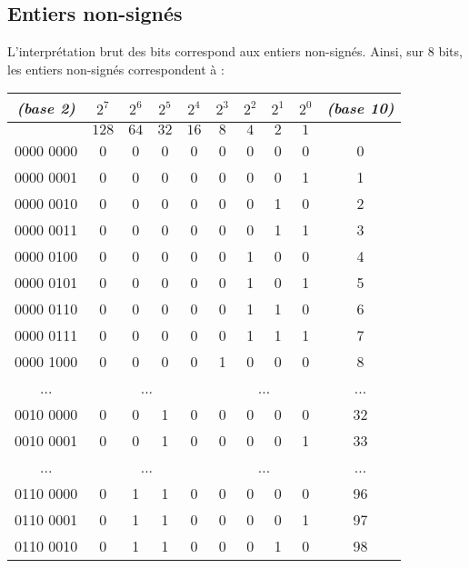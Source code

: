 \documentclass[11pt,a4paper]{article}
\begin{document}
\bigskip


\subsection{Entiers non-signés}

\medskip

L'interprétation brut des bits correspond aux entiers non-signés.
Ainsi, sur 8 bits, les entiers non-signés correspondent à :

\bigskip

\begin{center}
\begin{tabular}{ | c | c c c c | c c c c | c |}
\hline
\textit{(base 2)} & $ 2^7 $ & $ 2^6 $ & $ 2^5 $ & $ 2^4 $   &   $ 2^3 $ & $ 2^2 $ & $ 2^1 $ & $ 2^0 $ & \textit{(base 10)} \\
\hline
         & $ 128 $ & $  64 $ & $  32 $ & $  16 $   &   $   8 $ & $   4 $ & $   2 $ & $   1 $ & \\
\hline
0000 0000  &  0 & 0 & 0 & 0  &  0 & 0 & 0 & 0   & 0 \\
0000 0001  &  0 & 0 & 0 & 0  &  0 & 0 & 0 & 1   & 1 \\
0000 0010  &  0 & 0 & 0 & 0  &  0 & 0 & 1 & 0   & 2 \\
0000 0011  &  0 & 0 & 0 & 0  &  0 & 0 & 1 & 1   & 3 \\
0000 0100  &  0 & 0 & 0 & 0  &  0 & 1 & 0 & 0   & 4 \\
0000 0101  &  0 & 0 & 0 & 0  &  0 & 1 & 0 & 1   & 5 \\
0000 0110  &  0 & 0 & 0 & 0  &  0 & 1 & 1 & 0   & 6 \\
0000 0111  &  0 & 0 & 0 & 0  &  0 & 1 & 1 & 1   & 7 \\
0000 1000  &  0 & 0 & 0 & 0  &  1 & 0 & 0 & 0   & 8 \\
... & \multicolumn{4}{c|}{...} & \multicolumn{4}{c|}{...} & ... \\
0010 0000  &  0 & 0 & 1 & 0  &  0 & 0 & 0 & 0   & 32 \\
0010 0001  &  0 & 0 & 1 & 0  &  0 & 0 & 0 & 1   & 33 \\
... & \multicolumn{4}{c|}{...} & \multicolumn{4}{c|}{...} & ... \\
0110 0000  &  0 & 1 & 1 & 0  &  0 & 0 & 0 & 0   & 96 \\
0110 0001  &  0 & 1 & 1 & 0  &  0 & 0 & 0 & 1   & 97 \\
0110 0010  &  0 & 1 & 1 & 0  &  0 & 0 & 1 & 0   & 98 \\

\end{tabular}
\end{center}
\end{document}
